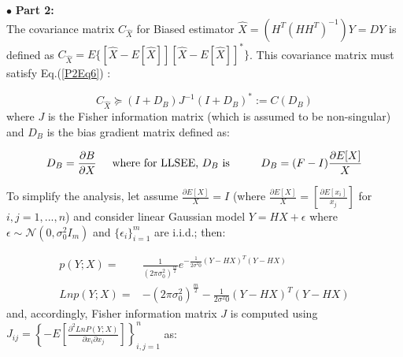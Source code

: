 

$\bullet$ \textbf{Part 2:} \\

The covariance matrix $C_{\hat{X}}$ for Biased estimator $\hat{X}=(H^{T}(HH^{T})^{-1})Y=DY$ is defined as  $C_{\hat{X}} = E\{[\hat{X}-E[\hat{X}]] [\hat{X}-E[\hat{X}]]^{*} \}$. This covariance matrix must satisfy Eq.(\ref{P2Eq6}) \cite{Hero, Eldar}:

\begin{equation}\label{P2Eq6}
C_{\hat{X}} \succeq (I+D_{B})J^{-1}(I+D_{B})^{*} := C(D_{B})
\end{equation}
where $J$ is the Fisher information matrix (which is assumed to be non-singular) and $D_{B}$ is the bias gradient matrix defined as:

\begin{equation}\label{P2Eq7}
D_{B} =  \frac{\partial B}{\partial X} \hspace{0.5cm}  \text{where for LLSEE, $D_{B}$ is}  \hspace{1cm} D_{B}=(F-I)\frac{\partial E[X]}{X}
\end{equation}

To simplify the analysis, let assume $\frac{\partial E[X]}{X}=I$ (where $\frac{\partial E[X]}{X}= \left[ \frac{\partial E[x_{i}]}{x_{j}} \right]$ for $i,j=1,...,n$) and consider linear Gaussian model $Y=HX+\epsilon$ where $\epsilon \sim \mathcal{N}(0,\sigma^{2}_{0}I_{m})$ and $\{\epsilon_{i}\}_{i=1}^{m}$ are i.i.d.; then:

\begin{equation}\label{P2Eq8}
\begin{aligned}
p(Y;X)    = & \frac{1}{(2\pi\sigma^{2}_{0})^{\frac{m}{2}}} e^{-\frac{1}{2\sigma^{2}{0}} (Y-HX)^{T}(Y-HX)} \\
Ln p(Y;X) = & -(2\pi\sigma^{2}_{0})^{\frac{m}{2}} - \frac{1}{2\sigma^{2}{0}} (Y-HX)^{T}(Y-HX)
\end{aligned}
\end{equation}
and, accordingly, Fisher information matrix $J$ \cite{Kay} is computed using $J_{ij}=\left\{-E\left[ \frac{\partial^{2} LnP(Y;X)}{\partial x_{i} \partial x_{j}}  \right]\right\}_{i,j=1}^{n}$ as:

